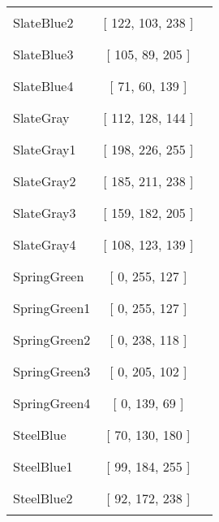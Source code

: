 \begin{tabular}{|l|c|c|}
SlateBlue2 & [ 122, 103, 238 ] & \color{SlateBlue2} \rule{1cm}{1.5ex}\\
SlateBlue3 & [ 105, 89, 205 ] & \color{SlateBlue3} \rule{1cm}{1.5ex}\\
SlateBlue4 & [ 71, 60, 139 ] & \color{SlateBlue4} \rule{1cm}{1.5ex}\\
SlateGray & [ 112, 128, 144 ] & \color{SlateGray} \rule{1cm}{1.5ex}\\
SlateGray1 & [ 198, 226, 255 ] & \color{SlateGray1} \rule{1cm}{1.5ex}\\
SlateGray2 & [ 185, 211, 238 ] & \color{SlateGray2} \rule{1cm}{1.5ex}\\
SlateGray3 & [ 159, 182, 205 ] & \color{SlateGray3} \rule{1cm}{1.5ex}\\
SlateGray4 & [ 108, 123, 139 ] & \color{SlateGray4} \rule{1cm}{1.5ex}\\
SpringGreen & [ 0, 255, 127 ] & \color{SpringGreen} \rule{1cm}{1.5ex}\\
SpringGreen1 & [ 0, 255, 127 ] & \color{SpringGreen1} \rule{1cm}{1.5ex}\\
SpringGreen2 & [ 0, 238, 118 ] & \color{SpringGreen2} \rule{1cm}{1.5ex}\\
SpringGreen3 & [ 0, 205, 102 ] & \color{SpringGreen3} \rule{1cm}{1.5ex}\\
SpringGreen4 & [ 0, 139, 69 ] & \color{SpringGreen4} \rule{1cm}{1.5ex}\\
SteelBlue & [ 70, 130, 180 ] & \color{SteelBlue} \rule{1cm}{1.5ex}\\
SteelBlue1 & [ 99, 184, 255 ] & \color{SteelBlue1} \rule{1cm}{1.5ex}\\
SteelBlue2 & [ 92, 172, 238 ] & \color{SteelBlue2} \rule{1cm}{1.5ex}\\
\end{tabular}


